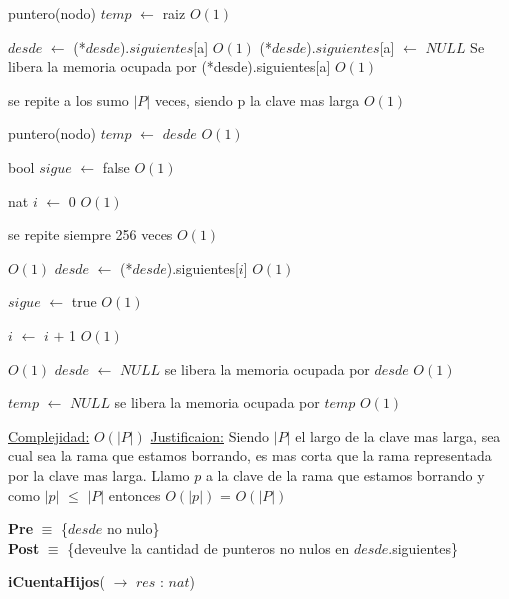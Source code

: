 \begin{Algoritmos}
\begin{algorithm}[H]
\begin{algorithmic}[1]
\State puntero(nodo) $temp$ $\gets$ raiz \Comment $O(1)$

\State $desde$ $\gets$ (*$desde$).$siguientes$[a] \Comment $O(1)$
\State (*$desde$).$siguientes$[a] $\gets$ $NULL$ \Comment Se libera la memoria ocupada por (*desde).siguientes[a] $O(1)$

 \Comment se repite a los sumo $|P|$ veces, siendo p la clave mas larga $O(1)$

	\State puntero(nodo) $temp$ $\gets$ $desde$ \Comment $O(1)$

	\State bool $sigue$ $\gets$ false \Comment $O(1)$

	\State nat $i$ $\gets$ 0 \State $O(1)$

	 \Comment se repite siempre 256 veces $O(1)$

		 \Comment $O(1)$
			\State $desde$ $\gets$ (*$desde$).siguientes[$i$] \Comment $O(1)$

			\State $sigue$ $\gets$ true \Comment $O(1)$

		\EndIf
		\State $i$ $\gets$ $i$ $+$ 1 \Comment $O(1)$

	\EndWhile

\EndWhile

 \Comment $O(1)$
	\State $desde$ $\gets$ $NULL$ \Comment se libera la memoria ocupada por $desde$ $O(1)$

\EndIf

\State $temp$ $\gets$ $NULL$ \Comment se libera la memoria ocupada por $temp$ $O(1)$


\medskip
\State \underline{Complejidad:} $O(|P|)$
\State \underline{Justificaion:} Siendo $|P|$ el largo de la clave mas larga, sea cual sea la rama que estamos borrando, es mas corta que la rama representada por la clave mas larga. Llamo $p$ a la clave de la rama que estamos borrando y como $|p|$ $\leq$ $|P|$ entonces $O(|p|)$ = $O(|P|)$

\end{algorithmic}
\end{algorithm}



\textbf{Pre} $\equiv$ \{$desde$ no nulo\}\\%
\textbf{Post} $\equiv$ \{deveulve la cantidad de punteros no nulos en $desde$.siguientes\}%

\begin{algorithm}[H]
{\textbf{iCuentaHijos}(} $\to$ $res$ : $nat$)
\begin{algorithmic}[1]


\end{algorithmic}
\end{algorithm}
\end{Algoritmos}
